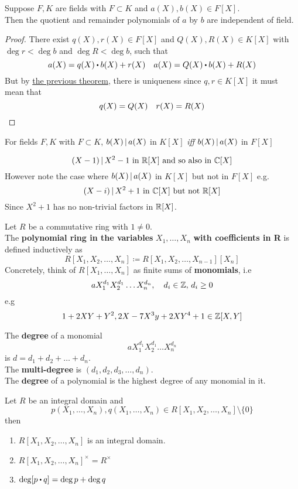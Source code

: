 \documentclass[../Main.tex]{subfiles}
\begin{document}
\begin{crl}
	Suppose $F,K$ are fields with $F\subset K$ and $a(X),b(X)\in F[X]$. \\
	Then the quotient and remainder polynomials of $a$ by $b$ are independent of field.
\end{crl}
\begin{proof}
	There exist $q(X),r(X)\in F[X]$ and $Q(X), R(X)\in K[X]$ with $\deg r< \deg b$ and $\deg R< \deg b$, such that
	\[a(X)=q(X)\rdot b(X)+r(X)\quad a(X)=Q(X)\rdot b(X)+R(X)\]
	But by \hyperref[thm:12.8]{the previous theorem}, there is uniqueness since $q,r\in K[X]$ it must mean that
	\[q(X)=Q(X)\quad r(X)=R(X)\qedhere\]
\end{proof}
\begin{crl}
	For fields $F,K$ with $F\subset K$, $b(X) \, | \, a(X)$ in $K[X]$ \textit{iff} $b(X) \, | \, a(X)$ in $F[X]$
\end{crl}
\begin{example}
	\[(X-1) \, | \, X^2-1 \text{ in } \mathbb{R}[X] \text{ and so also in }\mathbb{C}[X]\]
	However note the case where $b(X) \, | \, a(X)$ in $K[X]$ but not in $F[X]$ e.g.
	\[(X-i) \, | \, X^2+1 \text{ in } \mathbb{C}[X] \text{ but not } \mathbb{R}[X]\]
	Since $X^2+1$ has no non-trivial factors in $\mathbb{R}[X]$.
\end{example}
\begin{dfn}[title = Multivariable Polynoimal Ring]
	Let $R$ be a commutative ring with $1\ne 0$. \\
	The \textbf{polynomial ring in the variables }$X_1,\dots,X_n$ \textbf{with coefficients in R} is defined inductively as
	\[R[X_1,X_2,\dots,X_n]\coloneqq R[X_1,X_2,\dots,X_{n-1}][X_n]\]
	Concretely, think of $R[X_1,\dots,X_n]$ as finite sums of \textbf{monomials}, i.e 
	\[aX_1^{d_1}X_2^{d_1}\dots X_n^{d_n},\quad d_i\in \mathbb{Z}, \, d_i\ge 0\]
	e.g
	\[1+2XY+Y^2,2X-7X^3y+2XY^4+1\in \mathbb{Z}[X,Y]\]
\end{dfn}
\begin{dfn}[title = {Multi-Degree}]
	The \textbf{degree} of a monomial
	\[aX_1^{d_1}X_2^{d_1}\dots X_n^{d_n}\]
	is $d=d_1+d_2+\dots+d_n$.\\
	The \textbf{multi-degree} is $(d_1,d_2,d_3,\dots,d_n)$.\\
	The \textbf{degree} of a polynomial is the highest degree of any monomial in it.
\end{dfn}
\begin{prop}
	Let $R$ be an integral domain and
	\[p(X_1,\dots,X_n),q(X_1,\dots,X_n)\in R[X_1,X_2,\dots,X_n]\setminus\{0\}\] then
	\begin{enumerate}[label=(\arabic*)]
		\item $R[X_1,X_2,\dots,X_n]$ is an integral domain.
		\item $R[X_1,X_2,\dots,X_n]^\times = R^\times$
		\item $\deg[p\rdot q]=\deg p+\deg q$
	\end{enumerate}
\end{prop}
\end{document}

